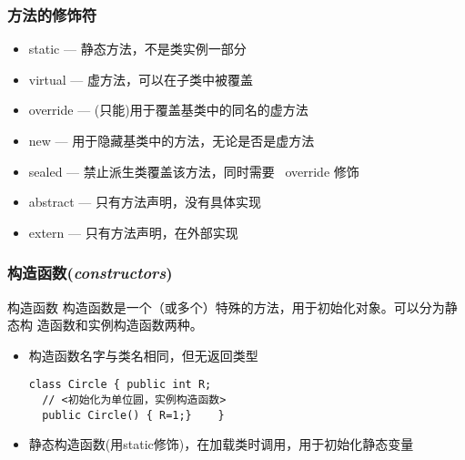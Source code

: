 \begin{frame}
\frametitle{方法的修饰符}
\begin{itemize}
    \setlength{\itemsep}{6pt plus 1pt}
\item static --- 静态方法，不是类实例一部分
\item virtual --- 虚方法，可以在子类中被覆盖
\item override --- (只能)用于覆盖基类中的同名的虚方法
\item new --- 用于隐藏基类中的方法，无论是否是虚方法
\item sealed --- 禁止派生类覆盖该方法，同时需要 ~override 修饰
\item abstract --- 只有方法声明，没有具体实现
\item extern --- 只有方法声明，在外部实现
\end{itemize}
\end{frame}


\begin{frame}[fragile]
\frametitle{构造函数(\textit{constructors})}
\begin{block}{构造函数}
  \CJKindent 构造函数是一个（或多个）特殊的方法，用于初始化对象。可以分为静态构
  造函数和实例构造函数两种。
\end{block}
\pause \medskip
\begin{itemize}
\item 构造函数名字与类名相同，但无返回类型
\begin{lstlisting}[escapeinside=<>]
class Circle { public int R;
  // <初始化为单位圆，实例构造函数>
  public Circle() { R=1;}    }
\end{lstlisting}
  \pause \medskip
\item 静态构造函数(用static修饰)，在加载类时调用，用于初始化静态变量
\end{itemize}
\end{frame}

